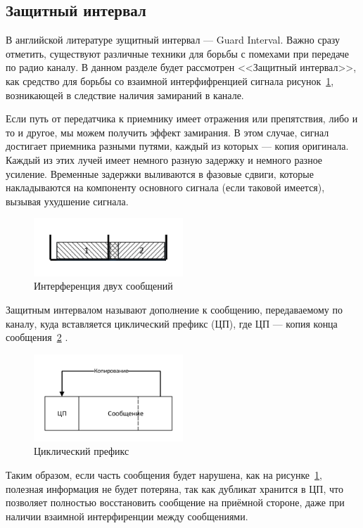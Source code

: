 \subsection{Защитный интервал}
В английской литературе зущитный интервал --- Guard Interval.
Важно сразу отметить, существуют различные техники для борьбы с помехами при передаче по радио 
каналу. В данном разделе будет рассмотрен <<Защитный интервал>>, как средство для борьбы со взаимной
интерфифренцией сигнала рисунок~\ref{fig:kov_interf}, возникающей в следствие наличия замираний в канале.

Если путь от передатчика к приемнику имеет отражения или 
препятствия, либо и то и другое, мы можем получить эффект замирания. В этом случае, сигнал достигает
приемника разными путями, каждый из которых --- копия оригинала. Каждый из этих лучей имеет
немного разную задержку и немного разное усиление. Временные задержки выливаются в
фазовые сдвиги, которые накладываются на компоненту основного сигнала (если таковой
имеется), вызывая ухудшение сигнала.

\begin{figure}[H]
    \centering
    \includegraphics[width=0.5\textwidth]{img/kov_interf}
    \caption{Интерференция двух сообщений}
    \label{fig:kov_interf}
\end{figure}

Защитным интервалом называют дополнение к сообщению, передаваемому по каналу, куда вставляется
циклический префикс (ЦП), где ЦП --- копия конца сообщения~\ref{fig:kov_CP} .

\begin{figure}[H]
    \centering
    \includegraphics[width=0.5\textwidth]{img/kov_CP}
    \caption{Циклический префикс}
    \label{fig:kov_CP}
\end{figure}

Таким образом, если часть сообщения будет нарушена, как на рисунке~\ref{fig:kov_interf}, полезная 
информация не будет потеряна, так как дубликат хранится в ЦП, что позволяет полностью восстановить
сообщение на приёмной стороне, даже при наличии взаимной интерфиренции между сообщениями.